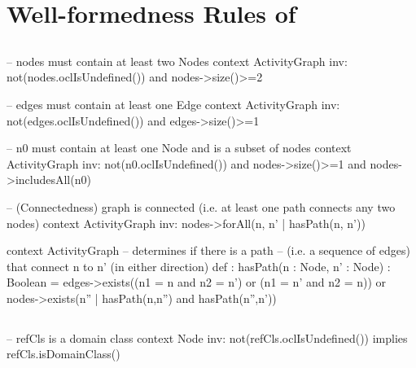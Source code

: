 %
\section{Well-formedness Rules of \agl} \label{apex:agl-rules}
%
\subsection{}
\begin{lstrule}
-- nodes must contain at least two Nodes
context ActivityGraph inv:
  not(nodes.oclIsUndefined()) and nodes->size()>=2
\end{lstrule}

\begin{lstrule}
-- edges must contain at least one Edge
context ActivityGraph inv:
  not(edges.oclIsUndefined()) and edges->size()>=1
\end{lstrule}

\begin{lstrule}
-- n0 must contain at least one Node and is a subset of nodes
context ActivityGraph inv:
  not(n0.oclIsUndefined()) and nodes->size()>=1 and nodes->includesAll(n0)
\end{lstrule}

\begin{lstrule}
-- (Connectedness) graph is connected (i.e. at least one path connects any two nodes)
context ActivityGraph inv:
  nodes->forAll(n, n' | hasPath(n, n'))
\end{lstrule}

\begin{lstrule}  
context ActivityGraph  
-- determines if there is a path 
-- (i.e. a sequence of edges) that connect n to n' (in either direction)
def : hasPath(n : Node, n' : Node) : Boolean = 
  edges->exists((n1 = n and n2 = n') or (n1 = n' and n2 = n)) or 
  nodes->exists(n'' | hasPath(n,n'') and hasPath(n'',n')) 
\end{lstrule}


%
\subsection{}
\begin{lstrule}
-- refCls is a domain class
context Node inv:
  not(refCls.oclIsUndefined()) implies refCls.isDomainClass()
\end{lstrule}

